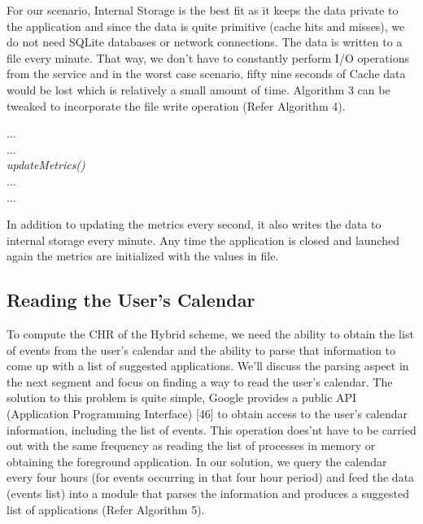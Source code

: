 \documentclass[12pt]{uthesis-v12}  %
\begin{document}
			For our scenario, Internal Storage is the best fit as it keeps the data private to the application and since the data is quite primitive (cache hits and misses), we do not need SQLite databases or network connections. The data is written to a file every minute. That way, we don't have to constantly perform I/O operations from the service and in the worst case scenario, fifty nine seconds of Cache data would be lost which is relatively a small amount of time. Algorithm 3 can be tweaked to incorporate the file write operation (Refer Algorithm 4).
			
			\begin{algorithm}[H]
				\SetAlgoLined
				
				{	
					...\\
					...\\
					{\em updateMetrics()}\\
					...\\
					...\\	
				}
				
				\caption[Modified Update Metrics Algorithm]{In addition to updating the metrics every second, it also writes the data to internal storage every minute. Any time the application is closed and launched again the metrics are initialized with the values in file.}
			\end{algorithm}
			
		\subsection{Reading the User's Calendar}
			To compute the CHR of the Hybrid scheme, we need the ability to obtain the list of events from the user's calendar and the ability to parse that information to come up with a list of suggested applications. We'll discuss the parsing aspect in the next segment and focus on finding a way to read the user's calendar. The solution to this problem is quite simple, Google provides a public API (Application Programming Interface) [46] to obtain access to the user's calendar information, including the list of events. This operation does'nt have to be carried out with the same frequency as reading the list of processes in memory or obtaining the foreground application. In our solution, we query the calendar every four hours (for events occurring in that four hour period) and feed the data (events list) into a module that parses the information and produces a suggested list of applications (Refer Algorithm 5). 
			
\end{document}
